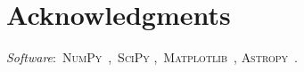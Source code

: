 \documentclass[ms.tex]{subfiles}
\begin{document}
\section{Acknowledgments}
\label{sec:acknowledgments}

\textit{Software}:~\textsc{NumPy}~\citep{Harris2020},~\textsc{SciPy}
\citep{Virtanen2020},~\textsc{Matplotlib}~\citep{Hunter2007},
\textsc{Astropy}~\citep{Astropy2013, Astropy2018, Astropy2022}.
\end{document}
